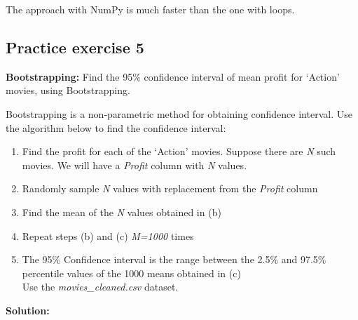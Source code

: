 \documentclass[
  letterpaper,
  DIV=11,
  numbers=noendperiod]{scrreprt}
\providecommand{\tightlist}{%
  \setlength{\itemsep}{0pt}\setlength{\parskip}{0pt}}\usepackage{longtable,booktabs,array}
\begin{document}
The approach with NumPy is much faster than the one with loops.

\hypertarget{practice-exercise-5-2}{%
\subsection{Practice exercise 5}\label{practice-exercise-5-2}}

\textbf{Bootstrapping:} Find the 95\% confidence interval of mean profit
for `Action' movies, using Bootstrapping.

Bootstrapping is a non-parametric method for obtaining confidence
interval. Use the algorithm below to find the confidence interval:

\begin{enumerate}
\def\labelenumi{\arabic{enumi}.}
\tightlist
\item
  Find the profit for each of the `Action' movies. Suppose there are
  \emph{N} such movies. We will have a \emph{Profit} column with
  \emph{N} values.\\
\item
  Randomly sample \emph{N} values with replacement from the
  \emph{Profit} column\\
\item
  Find the mean of the \emph{N} values obtained in (b)\\
\item
  Repeat steps (b) and (c) \emph{M=1000} times\\
\item
  The 95\% Confidence interval is the range between the 2.5\% and 97.5\%
  percentile values of the 1000 means obtained in (c)\\
  Use the \emph{movies\_cleaned.csv} dataset.
\end{enumerate}

\textbf{Solution:}
\end{document}
